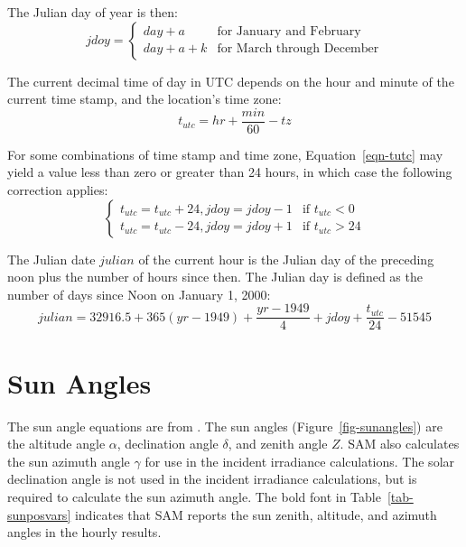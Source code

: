 \documentclass[12pt,letterpaper]{article}
\begin{document}
The Julian day of year is then:
\begin{equation}
\mathit{jdoy}= 
\left\{
   \begin{array}{ll}
      \mathit{day} + a & \text{for January and February}\\
      \mathit{day} + a + k & \text{for March through December}
   \end{array}
\right. 
\end{equation}

The current decimal time of day in UTC depends on the hour and minute of the current time stamp, and the location's time zone:
\begin{equation}\label{eqn-tutc}
t_{utc} = \mathit{hr} + \frac{\mathit{min}}{60} - \mathit{tz}
\end{equation}

For some combinations of time stamp and time zone, Equation~\ref{eqn-tutc} may yield a value less than zero or greater than 24 hours, in which case the following correction applies:
\begin{equation}
\left\{
   \begin{array}{ll}
      t_{utc} = t_{utc} + 24, \mathit{jdoy} = \mathit{jdoy} - 1 & 
      \text{if $t_{utc}<0$}\\
      t_{utc} = t_{utc} - 24,  \mathit{jdoy} = \mathit{jdoy} + 1 & 
      \text{if $t_{utc}>24$}
   \end{array}
\right. 
\end{equation}

The Julian date $\mathit{julian}$ of the current hour is the Julian day of the preceding noon plus the number of hours since then. The Julian day is defined as the number of days since Noon on January 1, 2000:
\begin{equation}\label{eqn-jday}
\mathit{julian} = 32916.5 + 365(\mathit{yr}-1949) + \frac{\mathit{yr}-1949}{4} + \mathit{jdoy} + \frac{t_{utc}}{24} - 51545
\end{equation}

\section{Sun Angles} \label{sec-sunangles}

The sun angle equations are from \citet{michalsky1988}. The sun angles (Figure~\ref{fig-sunangles}) are the altitude angle $\alpha$, declination angle $\delta$, and zenith angle $Z$. SAM also calculates the sun azimuth angle $\gamma$ for use in the incident irradiance calculations. The solar declination angle is not used in the incident irradiance calculations, but is required to calculate the sun azimuth angle. The bold font in Table~\ref{tab-sunposvars} indicates that SAM reports the sun zenith, altitude, and azimuth angles in the hourly results.
\end{document}
